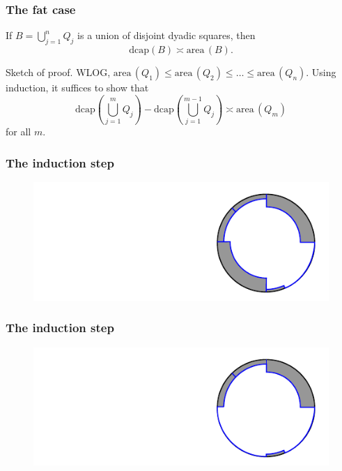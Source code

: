 \documentclass[xcolor=pdftex,dvipsnames,table]{beamer}
\newcommand{\area}{\text{area}\,}
\newcommand{\dcap}{\text{dcap}}
\theoremstyle{definition}
\begin{document}
\begin{frame}
  \frametitle{The fat case}
  \begin{lemma}
    If $B = \bigcup_{j=1}^n Q_j$ is a union of disjoint dyadic squares, then
    \[
        \dcap(B) \asymp \area(B).
    \]
  \end{lemma}
  {\color{blue} Sketch of proof.} WLOG, $\area(Q_1) \leq \area(Q_2) \leq \dots \leq \area(Q_n)$.
  Using induction, it suffices to show that
  \[
      \dcap \left( \bigcup_{j=1}^{m} Q_j \right) - \dcap \left( \bigcup_{j=1}^{m-1} Q_j \right) \asymp
      \area(Q_m)
  \]
  for all $m$.
\end{frame}

\begin{frame}
  \frametitle{The induction step}
  \begin{figure}
    \includegraphics[scale=1]{figures/removeOneSquare_01.pdf}
  \end{figure}
\end{frame}

\begin{frame}
  \frametitle{The induction step}
  \begin{figure}
    \includegraphics[scale=1]{figures/removeOneSquare_02.pdf}
  \end{figure}
\end{frame}
\end{document}
